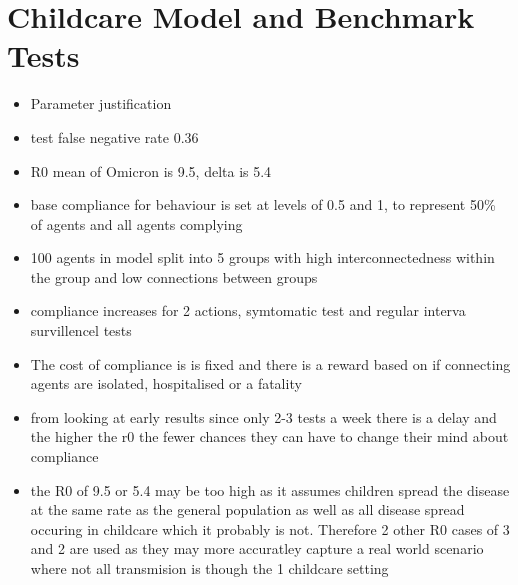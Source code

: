 \documentclass{article}
\begin{document}
\section{Childcare Model and Benchmark Tests}

\begin{itemize}

\item Parameter justification
\item test false negative rate 0.36 ~\cite{van_de_mortel_2022}
\item R0 mean of Omicron is 9.5, delta is 5.4 ~\cite{liu_rocklov_2022}
\item base compliance for behaviour is set at levels of  0.5 and 1, to represent 50\% of agents and all agents complying
\item 100 agents in model split into 5 groups with high interconnectedness within the group and low connections between groups

\item compliance increases for 2 actions,  symtomatic test and regular interva survillencel tests
\item The cost of compliance is is fixed and there is a reward based on if connecting agents are isolated, hospitalised or a fatality

\item from looking at early results since only 2-3 tests a week there is a delay and the higher the r0 the fewer chances they can have to change their mind about compliance 

\item the R0 of 9.5 or 5.4 may be too high as it assumes children spread the disease at the same rate as the general population as well as all disease spread occuring in childcare which it probably is not. Therefore 2 other R0 cases of 3 and 2 are used as they may more accuratley capture a real world scenario where not all transmision is though the 1 childcare setting
\end{itemize}
\end{document}
